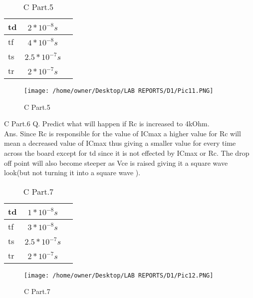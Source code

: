 \documentclass{article}
\begin{document}
\begin{table}[H]
	\centering
	\label{tab:eigthTable}
	\caption[C Part.5 Table]{C Part.5}
	\begin{tabular}{lcr}
		td&$2*10^{-8}s$\\ \hline
		tf&$4*10^{-8}s$\\ \hline
		ts&$2.5*10^{-7}s$\\ \hline
		tr&$2*10^{-7}s$\\ \hline

	\end{tabular}
\end{table}


\begin{figure}[H]
	\centering
	\texttt{[image: /home/owner/Desktop/LAB REPORTS/D1/Pic11.PNG]}
	\caption[C Part.5 Plot]{C Part.5}
	\label{fig:pic}
\end{figure}
\pagebreak
C Part.6
Q. Predict what will happen if Rc is increased to 4kOhm.\\
Ans. Since Rc is responsible for the value of ICmax a higher value for Rc will mean a decreased value of ICmax thus giving a smaller value for every time across the board except for td  since it is not effected by ICmax  or Rc. The drop off point will also become steeper as Vce is raised giving it a square wave look(but not turning it into a square wave ).




\begin{table}[H]

	\centering
	\caption[C Part.7 Table]{C Part.7}
	\begin{tabular}{lcr}
		td&$1*10^{-8}s$ \\ \hline
		tf&$3*10^{-8}s$\\ \hline
		ts&$2.5*10^{-7}s$\\ \hline
		tr&$2*10^{-7}s$\\ \hline

	\end{tabular}
\end{table}


\begin{figure}[H]
	\centering
	\texttt{[image: /home/owner/Desktop/LAB REPORTS/D1/Pic12.PNG]}
	\caption[C Part.7 Plot]{C Part.7}
\end{figure}


\pagebreak
\end{document}
